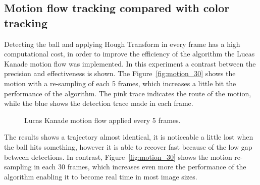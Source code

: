 \documentclass[10pt,twocolumn,letterpaper]{article}
\begin{document}
\subsection{Motion flow tracking compared with color tracking}

Detecting the ball and applying Hough Transform in every frame has a high computational cost, in order to improve the efficiency of the algorithm the Lucas Kanade motion flow was implemented. In this experiment a contrast between the precision and effectiveness is shown. The Figure~\ref{fig:motion_30} shows the motion with a re-sampling of each 5 frames, which increases a little bit the performance of the algorithm. The pink trace indicates the route of the motion, while the blue shows the detection trace made in each frame.

\begin{figure}[!h]
	\centering
	\setlength{\fboxsep}{1pt}
	\setlength{\fboxrule}{1pt}
	\caption{Lucas Kanade motion flow applied every 5 frames.}\label{fig:motion_5}
\end{figure}

The results shows a trajectory almost identical, it is noticeable a little lost when the ball hits something, however it is able to recover fast because of the low gap between detections. In contrast, Figure~\ref{fig:motion_30} shows the motion re-sampling in each 30 frames, which increases even more the performance of the algorithm enabling it to become real time in most image sizes.
\end{document}
